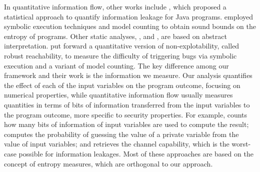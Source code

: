 In quantitative information flow, other works include , which proposed a statistical approach to quantify information leakage for Java programs.  employed symbolic execution techniques and model counting to obtain sound bounds on the entropy of programs.
Other static analyses, \eg,  and , are based on abstract interpretation.
 put forward a quantitative version of non-explotability, called robust reachability, to measure the difficulty of triggering bugs via symbolic execution and a variant of model counting.
%
%
The key difference among our framework and their work is the information we measure. Our analysis quantifies the effect of each of the input variables on the program outcome, focusing on numerical properties, while quantitative information flow usually measures quantities in terms of bits of information transferred from the input variables to the program outcome, more specific to security properties.
For example,  counts how many bits of information of input variables are used to compute the result;  computes the probability of guessing the value of a private variable from the value of input variables; and  retrieves the channel capability, which is the worst-case possible for information leakages. Most of these approaches are based on the concept of entropy measures, which are orthogonal to our approach.
